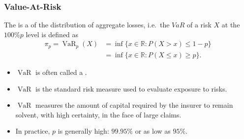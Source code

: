 \documentclass[notoc,notitlepage]{tufte-book}
\DeclareMathOperator{\VaR}{VaR}
\begin{document}
\subsubsection{Value-At-Risk}\label{ssub:Value-At-Risk}

\begin{defn}\label{defn:value_at_risk}
The  is a  of the distribution of aggregate losses, i.e.\ the $VaR$ of a risk $X$ at the $100\%p$ level is defined as
  \begin{align*}
    \pi_p = \VaR_p (X) &= \inf \{ x \in \mathbb{R} : P (X > x) \leq 1 - p \} \\
               &= \inf \{ x \in \mathbb{R} : P (X \leq x) \geq p \}.
  \end{align*}
\end{defn}

\begin{note}
  \begin{itemize}
    \item $\VaR$ is often called a .
    \item $\VaR$ is the standard risk measure used to evaluate exposure to risks.
    \item $\VaR$ measures the amount of capital required by the insurer to remain solvent, with high certainty, in the face of large claims.
    \item In practice, $p$ is generally high: $99.95\%$ or as low as $95\%$.
  \end{itemize}
\end{note}
\end{document}
